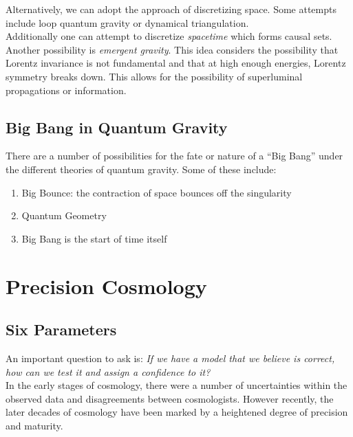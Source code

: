 \documentclass{article}
\begin{document}
Alternatively, we can adopt the approach of discretizing space. Some attempts include loop quantum gravity or dynamical triangulation. \\

Additionally one can attempt to discretize \textit{spacetime} which forms causal sets. \\

Another possibility is \textit{emergent gravity}. This idea considers the possibility that Lorentz invariance is not fundamental and that at high enough energies, Lorentz symmetry breaks down. This allows for the possibility of superluminal propagations or information.

\subsection{Big Bang in Quantum Gravity}

There are a number of possibilities for the fate or nature of a ``Big Bang'' under the different theories of quantum gravity. Some of these include:
\begin{enumerate}
    \item Big Bounce: the contraction of space bounces off the singularity
    \item Quantum Geometry
    \item Big Bang is the start of time itself
\end{enumerate}


\section{Precision Cosmology}

\subsection{Six Parameters}
An important question to ask is: \textit{If we have a model that we believe is correct, how can we test it and assign a confidence to it?}\\

In the early stages of cosmology, there were a number of uncertainties within the observed data and disagreements between cosmologists. However recently, the later decades of cosmology have been marked by a heightened degree of precision and maturity. \\
\end{document}
